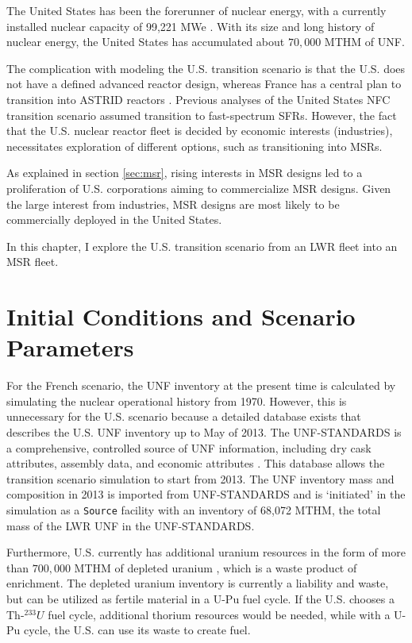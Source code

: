 
The United States has been the forerunner of nuclear energy, with a currently 
installed nuclear capacity of 99,221 \gls{MWe} \cite{iaea_nuclear_2017}.
With its size and long history of nuclear
energy, the United States has accumulated about $70,000$ \gls{MTHM} of \gls{UNF}.

The complication with modeling the U.S. transition scenario is that the U.S. does not have
a defined advanced reactor design, whereas France has a central plan to transition into \gls{ASTRID} reactors \cite{boullis_french_2015, varaine_pre-conceptual_2012}.
Previous analyses \cite{worrall_utilization_2013, sunny_transition_2015}
of the United States \gls{NFC} transition scenario
assumed transition to fast-spectrum \glspl{SFR}.
However, the fact that the U.S. nuclear reactor fleet
is decided by economic interests (industries), necessitates
exploration of different options, such as transitioning into \glspl{MSR}.

As explained in section \ref{sec:msr}, rising interests in \gls{MSR} designs
led to a proliferation of U.S. corporations aiming to commercialize
\gls{MSR} designs. Given the large interest from industries,
\gls{MSR} designs are
most likely to be commercially deployed in the United States.

In this chapter, I explore the U.S. transition scenario
from an \gls{LWR} fleet into an \gls{MSR} fleet.

\section{Initial Conditions and Scenario Parameters}

For the French scenario, the \gls{UNF} inventory at the present
time is calculated by simulating the nuclear operational history from 1970.
However, this is unnecessary for the U.S. scenario because a detailed
database exists that describes the U.S. \gls{UNF} inventory up to May of 2013.
The \gls{UNF-STANDARDS} is a comprehensive,
controlled source of \gls{UNF} information, including dry cask attributes, assembly
data, and economic attributes \cite{peterson_unf-st&dards_2017}. This database
allows the transition scenario simulation to start from 2013. The \gls{UNF} inventory mass and composition in 2013
is imported from \gls{UNF-STANDARDS} and is `initiated' in the simulation
as a \texttt{Source} facility with an inventory of 68,072 MTHM,
the total mass of the \gls{LWR} \gls{UNF} in the \gls{UNF-STANDARDS}.

Furthermore, U.S. currently has additional uranium resources in the
form of more than $700,000$ MTHM of depleted uranium \cite{office_nuclear_2011},
which is a waste product of enrichment. The depleted uranium inventory
is currently a liability and waste, but can be utilized as fertile material
in a U-Pu fuel cycle. If the U.S. chooses a Th-$^233U$ fuel cycle,
additional thorium resources would be needed, while with a U-Pu cycle, the
U.S. can use its waste to create fuel.

